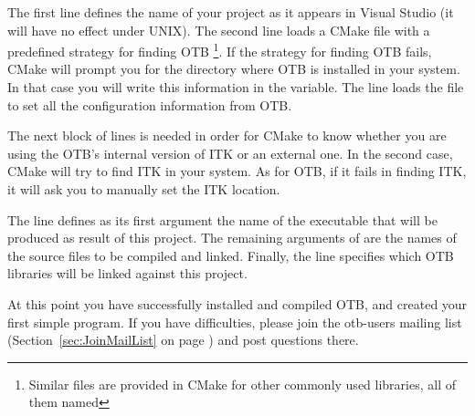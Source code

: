 \normalsize

The first line defines the name of your project as it appears in Visual
Studio (it will have no effect under UNIX). The second line loads a CMake
file with a predefined strategy for finding OTB \footnote{Similar files are
provided in CMake for other commonly used libraries, all of them named
}. If the strategy for finding OTB fails, CMake will prompt
you for the directory where OTB is installed in your system. In that case you
will write this information in the  variable. The line  loads the  file to set
all the configuration information from OTB.

The next block of lines is needed in order for CMake to know whether you
are using the OTB's internal version of ITK or an external one. In the
second case, CMake will try to find ITK in your system. As for OTB, if
it fails in finding ITK, it will ask you to manually set the ITK location.

The line 
defines as its first argument the name of the executable that will be produced
as result of this project. The remaining arguments of 
are the names of the source files to be compiled and linked.  Finally, the
 line specifies which OTB libraries will be
linked against this project.




At this point you have successfully installed and compiled OTB, and created
your first simple program. If you have difficulties, please join the
otb-users mailing list (Section~\ref{sec:JoinMailList} on page
\pageref{sec:JoinMailList}) and post questions there.
